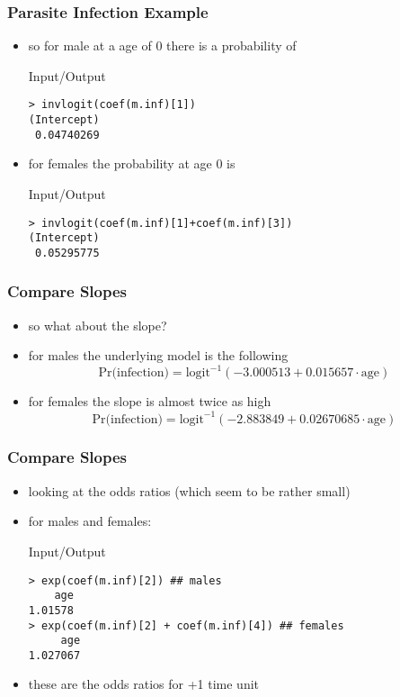 \begin{frame}[fragile]\frametitle{Parasite Infection Example}
\begin{itemize}
\item so for male at a age of 0 there is a probability of
    \begin{exampleblock}{Input/Output}
\begin{verbatim}
> invlogit(coef(m.inf)[1])
(Intercept) 
 0.04740269 
\end{verbatim}
    \end{exampleblock}
  \item for females the probability at age 0 is
    \begin{exampleblock}{Input/Output}
\begin{verbatim}
> invlogit(coef(m.inf)[1]+coef(m.inf)[3])
(Intercept) 
 0.05295775 
\end{verbatim}
  \end{exampleblock}
\end{itemize}
\end{frame}


\begin{frame}[fragile]\frametitle{Compare Slopes}
\begin{itemize}
\item so what about the slope?
\item for males the underlying model is the following
$$\mbox{Pr(infection)}=\mbox{logit}^{-1}(-3.000513 + 0.015657 \cdot \mbox{age}) $$
\item for females the slope is almost twice as high
  $$\mbox{Pr(infection)}=\mbox{logit}^{-1}(-2.883849 + 0.02670685  \cdot \mbox{age}) $$
\end{itemize}
\end{frame}


\begin{frame}[fragile]\frametitle{Compare Slopes}
\begin{itemize}
\item looking at the odds ratios (which seem to be rather small)
\item for males and females:
  \begin{exampleblock}{Input/Output}\small
\begin{verbatim}
> exp(coef(m.inf)[2]) ## males
    age 
1.01578 
> exp(coef(m.inf)[2] + coef(m.inf)[4]) ## females
     age  
1.027067 
\end{verbatim}
  \end{exampleblock}
\item these are the odds ratios for +1 time unit
\end{itemize}
\end{frame}

